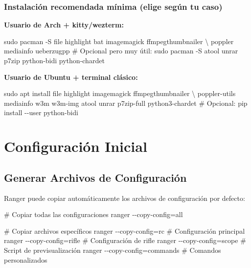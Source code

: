 \documentclass[
  doc,
  floatsintext,
  longtable,
  a4paper,
  nolmodern,
  notxfonts,
  notimes,
  12pt,
  colorlinks=true,linkcolor=blue,citecolor=blue,urlcolor=blue]{apa7}
\newenvironment{Shaded}{\begin{snugshade}}{\end{snugshade}}
\newcommand{\AttributeTok}[1]{\textcolor[rgb]{0.40,0.45,0.13}{#1}}
\newcommand{\CommentTok}[1]{\textcolor[rgb]{0.37,0.37,0.37}{#1}}
\newcommand{\DataTypeTok}[1]{\textcolor[rgb]{0.68,0.00,0.00}{#1}}
\newcommand{\ExtensionTok}[1]{\textcolor[rgb]{0.00,0.23,0.31}{#1}}
\newcommand{\FunctionTok}[1]{\textcolor[rgb]{0.28,0.35,0.67}{#1}}
\newcommand{\NormalTok}[1]{\textcolor[rgb]{0.00,0.23,0.31}{#1}}
\newcommand{\OperatorTok}[1]{\textcolor[rgb]{0.37,0.37,0.37}{#1}}
\begin{document}
\subsubsection{Instalación recomendada mínima (elige según tu
caso)}\label{instalaciuxf3n-recomendada-muxednima-elige-seguxfan-tu-caso}

\textbf{Usuario de Arch + kitty/wezterm:}

\begin{Shaded}
\begin{Highlighting}[]
\FunctionTok{sudo}\NormalTok{ pacman }\AttributeTok{{-}S}\NormalTok{ file highlight bat imagemagick ffmpegthumbnailer }\DataTypeTok{\textbackslash{}}
\NormalTok{poppler mediainfo ueberzugpp}
\CommentTok{\# Opcional pero muy útil:}
\FunctionTok{sudo}\NormalTok{ pacman }\AttributeTok{{-}S}\NormalTok{ atool unrar p7zip python{-}bidi python{-}chardet}
\end{Highlighting}
\end{Shaded}

\textbf{Usuario de Ubuntu + terminal clásico:}

\begin{Shaded}
\begin{Highlighting}[]
\FunctionTok{sudo}\NormalTok{ apt install file highlight imagemagick ffmpegthumbnailer }\DataTypeTok{\textbackslash{}}
\NormalTok{poppler{-}utils mediainfo w3m w3m{-}img atool unrar p7zip{-}full python3{-}chardet}
\CommentTok{\# Opcional: pip install {-}{-}user python{-}bidi}
\end{Highlighting}
\end{Shaded}

\section{Configuración Inicial}\label{configuraciuxf3n-inicial}

\subsection{Generar Archivos de
Configuración}\label{generar-archivos-de-configuraciuxf3n}

Ranger puede copiar automáticamente los archivos de configuración por
defecto:

\begin{Shaded}
\begin{Highlighting}[]
\CommentTok{\# Copiar todas las configuraciones}
\ExtensionTok{ranger} \AttributeTok{{-}{-}copy{-}config}\OperatorTok{=}\NormalTok{all}

\CommentTok{\# Copiar archivos específicos}
\ExtensionTok{ranger} \AttributeTok{{-}{-}copy{-}config}\OperatorTok{=}\NormalTok{rc          }\CommentTok{\# Configuración principal}
\ExtensionTok{ranger} \AttributeTok{{-}{-}copy{-}config}\OperatorTok{=}\NormalTok{rifle       }\CommentTok{\# Configuración de rifle}
\ExtensionTok{ranger} \AttributeTok{{-}{-}copy{-}config}\OperatorTok{=}\NormalTok{scope       }\CommentTok{\# Script de previsualización}
\ExtensionTok{ranger} \AttributeTok{{-}{-}copy{-}config}\OperatorTok{=}\NormalTok{commands    }\CommentTok{\# Comandos personalizados}
\end{Highlighting}
\end{Shaded}
\end{document}
